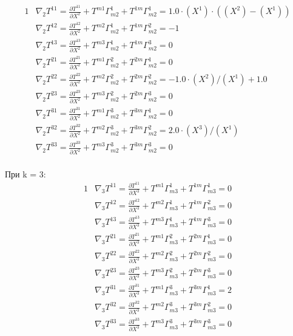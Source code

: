 \documentclass[a4paper, 12pt, oneside]{article}
\begin{document}
\begin{alignat*}{1}
  & \nabla_2T^{11} = \frac{\partial T^{11}}{\partial X^2} + T^{m1}\Gamma^1_{m2} + T^{1m}\Gamma^1_{m2} = 1.0\cdot (X^1)\cdot ((X^2) - (X^1)) \\
  & \nabla_2T^{12} = \frac{\partial T^{12}}{\partial X^2} + T^{m2}\Gamma^1_{m2} + T^{1m}\Gamma^2_{m2} = -1 \\
  & \nabla_2T^{13} = \frac{\partial T^{13}}{\partial X^2} + T^{m3}\Gamma^1_{m2} + T^{1m}\Gamma^3_{m2} = 0 \\
  & \nabla_2T^{21} = \frac{\partial T^{21}}{\partial X^2} + T^{m1}\Gamma^2_{m2} + T^{2m}\Gamma^1_{m2} = 0 \\
  & \nabla_2T^{22} = \frac{\partial T^{22}}{\partial X^2} + T^{m2}\Gamma^2_{m2} + T^{2m}\Gamma^2_{m2} = -1.0\cdot (X^2)/(X^1) + 1.0 \\
  & \nabla_2T^{23} = \frac{\partial T^{23}}{\partial X^2} + T^{m3}\Gamma^2_{m2} + T^{2m}\Gamma^3_{m2} = 0 \\
  & \nabla_2T^{31} = \frac{\partial T^{31}}{\partial X^2} + T^{m1}\Gamma^3_{m2} + T^{3m}\Gamma^1_{m2} = 0 \\
  & \nabla_2T^{32} = \frac{\partial T^{32}}{\partial X^2} + T^{m2}\Gamma^3_{m2} + T^{3m}\Gamma^2_{m2} = 2.0\cdot (X^3)/(X^1) \\
  & \nabla_2T^{33} = \frac{\partial T^{33}}{\partial X^2} + T^{m3}\Gamma^3_{m2} + T^{3m}\Gamma^3_{m2} = 0 
\end{alignat*}\\
При k = 3:\\
\begin{alignat*}{1}
  & \nabla_3T^{11} = \frac{\partial T^{11}}{\partial X^3} + T^{m1}\Gamma^1_{m3} + T^{1m}\Gamma^1_{m3} = 0 \\
  & \nabla_3T^{12} = \frac{\partial T^{12}}{\partial X^3} + T^{m2}\Gamma^1_{m3} + T^{1m}\Gamma^2_{m3} = 0 \\
  & \nabla_3T^{13} = \frac{\partial T^{13}}{\partial X^3} + T^{m3}\Gamma^1_{m3} + T^{1m}\Gamma^3_{m3} = 0 \\
  & \nabla_3T^{21} = \frac{\partial T^{21}}{\partial X^3} + T^{m1}\Gamma^2_{m3} + T^{2m}\Gamma^1_{m3} = 0 \\
  & \nabla_3T^{22} = \frac{\partial T^{22}}{\partial X^3} + T^{m2}\Gamma^2_{m3} + T^{2m}\Gamma^2_{m3} = 0 \\
  & \nabla_3T^{23} = \frac{\partial T^{23}}{\partial X^3} + T^{m3}\Gamma^2_{m3} + T^{2m}\Gamma^3_{m3} = 0 \\
  & \nabla_3T^{31} = \frac{\partial T^{31}}{\partial X^3} + T^{m1}\Gamma^3_{m3} + T^{3m}\Gamma^1_{m3} = 2 \\
  & \nabla_3T^{32} = \frac{\partial T^{32}}{\partial X^3} + T^{m2}\Gamma^3_{m3} + T^{3m}\Gamma^2_{m3} = 0 \\
  & \nabla_3T^{33} = \frac{\partial T^{33}}{\partial X^3} + T^{m3}\Gamma^3_{m3} + T^{3m}\Gamma^3_{m3} = 0 
\end{alignat*}\\
\end{document}
